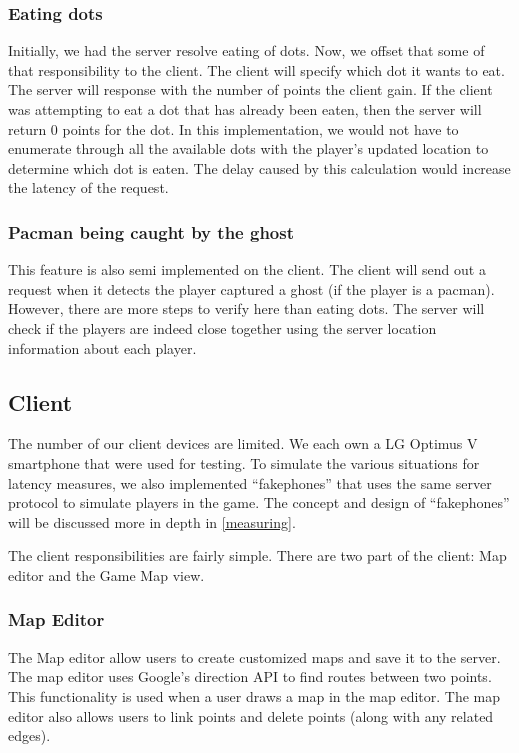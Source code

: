 \documentclass{acm_proc_article-sp}
\begin{document}
\subsubsection{Eating dots}
Initially, we had the server resolve eating of dots. Now, we offset
that some of that responsibility to the client. The client will
specify which dot it wants to eat. The server will response with the
number of points the client gain. If the client was attempting to eat
a dot that has already been eaten, then the server will return 0
points for the dot. In this implementation, we would not have to
enumerate through all the available dots with the player's updated
location to determine which dot is eaten. The delay caused by this
calculation would increase the latency of the request.

\subsubsection{Pacman being caught by the ghost}
This feature is also semi implemented on the client. The client will
send out a request when it detects the player captured a ghost (if the
player is a pacman). However, there are more steps to verify here than
eating dots. The server will check if the players are indeed close
together using the server location information about each player.

\subsection{Client}

The number of our client devices are limited. We each own a LG Optimus
V smartphone that were used for testing. To simulate the various
situations for latency measures, we also implemented ``fakephones''
that uses the same server protocol to simulate players in the
game. The concept and design of ``fakephones'' will be discussed more
in depth in \ref{measuring}.

The client responsibilities are fairly simple. There are two part of
the client: Map editor and the Game Map view.

\subsubsection{Map Editor}
The Map editor allow users to create customized maps and save it to
the server. The map editor uses Google's direction API
\cite{GoogleDirection} to find routes between two points. This
functionality is used when a user draws a map in the map editor. The
map editor also allows users to link points and delete points (along
with any related edges).
\end{document}

